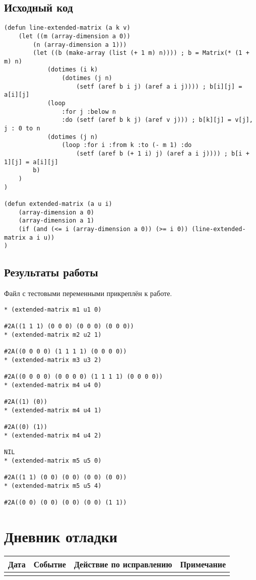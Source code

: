 \documentclass[12pt]{article}
\begin{document}
\subsection{Исходный код}
\begin{verbatim}
(defun line-extended-matrix (a k v)
    (let ((m (array-dimension a 0))
        (n (array-dimension a 1)))
        (let ((b (make-array (list (+ 1 m) n)))) ; b = Matrix(* (1 + m) n)
            (dotimes (i k)
                (dotimes (j n)
                    (setf (aref b i j) (aref a i j)))) ; b[i][j] = a[i][j]
            (loop
                :for j :below n
                :do (setf (aref b k j) (aref v j))) ; b[k][j] = v[j], j : 0 to n
            (dotimes (j n)
                (loop :for i :from k :to (- m 1) :do
                    (setf (aref b (+ 1 i) j) (aref a i j)))) ; b[i + 1][j] = a[i][j]
        b)
    )
)

(defun extended-matrix (a u i)
    (array-dimension a 0)
    (array-dimension a 1)
    (if (and (<= i (array-dimension a 0)) (>= i 0)) (line-extended-matrix a i u))
)
\end{verbatim}

\subsection{Результаты работы}
Файл с тестовыми переменными прикреплён к работе.
\begin{verbatim}
* (extended-matrix m1 u1 0)

#2A((1 1 1) (0 0 0) (0 0 0) (0 0 0))
* (extended-matrix m2 u2 1)

#2A((0 0 0 0) (1 1 1 1) (0 0 0 0))
* (extended-matrix m3 u3 2)

#2A((0 0 0 0) (0 0 0 0) (1 1 1 1) (0 0 0 0))
* (extended-matrix m4 u4 0)

#2A((1) (0))
* (extended-matrix m4 u4 1)

#2A((0) (1))
* (extended-matrix m4 u4 2)

NIL
* (extended-matrix m5 u5 0)

#2A((1 1) (0 0) (0 0) (0 0) (0 0))
* (extended-matrix m5 u5 4)

#2A((0 0) (0 0) (0 0) (0 0) (1 1))
\end{verbatim}

\section{Дневник отладки}
\begin{tabular}{|p{50pt}|p{130pt}|p{130pt}|p{70pt}|}
\hline
Дата & Событие & Действие по исправлению & Примечание \\ \hline
& & &\\
\hline
\end{tabular}
\end{document}

